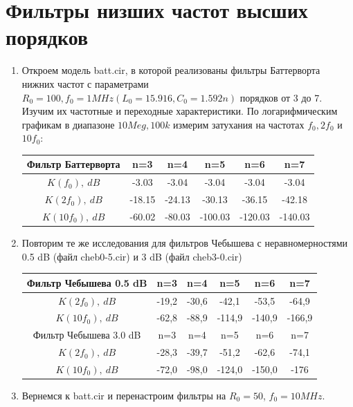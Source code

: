 \documentclass[a4paper, 12pt]{article}%
\begin{document}
\section{Фильтры низших частот высших порядков}

\begin{enumerate}

\item Откроем модель batt.cir, в которой реализованы фильтры Баттерворта нижних частот с параметрами $R_0 = 100, f_0 = 1MHz (L_0= 15.916, C_0 = 1.592n)$ порядков от 3 до 7. Изучим их частотные и переходные характеристики. По логарифмическим графикам в диапазоне $10Meg, 100k$ измерим затухания на частотах $f_0, 2f_0$ и $10f_0$:

\begin{center}
\begin{tabular}{|c|c|c|c|c|c|}
\hline 
Фильтр Баттерворта & n=3 & n=4 & n=5 & n=6 & n=7 \\ 
\hline 
$K(f_0), \: dB$ & -3.03 & -3.04 & -3.04 & -3.04 & -3.04 \\ 
\hline 
$K(2f_0), \: dB$ & -18.15 & -24.13 & -30.13 & -36.15 & -42.18 \\ 
\hline 
$K(10f_0), \: dB$ & -60.02 & -80.03 & -100.03 & -120.03 & -140.03 \\ 
\hline 
\end{tabular} 
\end{center}

\item Повторим те же исследования для фильтров Чебышева с неравномерностями 0.5 dB (файл cheb0-5.cir) и 3 dB (файл cheb3-0.cir)

\begin{center}
\begin{tabular}{|c|c|c|c|c|c|}
\hline 
Фильтр Чебышева 0.5 dB & n=3 & n=4 & n=5 & n=6 & n=7 \\ 
\hline 
$K(2f_0), \: dB$ & -19,2 & -30,6 & -42,1 & -53,5 & -64,9 \\ 
\hline 
$K(10f_0), \: dB$ & -62,8 & -88,9 & -114,9 & -140,9 & -166,9 \\ 
\hline 
Фильтр Чебышева 3.0 dB & n=3 & n=4 & n=5 & n=6 & n=7 \\ 
\hline 
$K(2f_0), \: dB$ & -28,3 & -39,7 & -51,2 & -62,6 & -74,1 \\ 
\hline 
$K(10f_0), \: dB$ & -72,0 & -98,0 & -124,0 & -150,0 & -176 \\ 
\hline 
\end{tabular} 
\end{center}

\item Вернемся к batt.cir и перенастроим фильтры на $R_0 = 50$, $f_0 = 10MHz$.

\end{enumerate}
\end{document}
